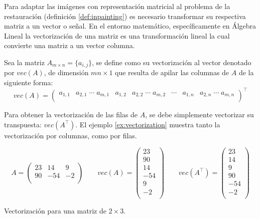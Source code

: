 Para adaptar las im\'agenes con representaci\'on matricial al problema de la restauraci\'on (definición \ref{def:inpainting}) es necesario transformar su respectiva matriz a un vector o señal. En el entorno matem\'atico, específicamente en \'Algebra Lineal \cite{enwiki:la} la vectorizaci\'on de una matriz es una transformaci\'on lineal la cual convierte una matriz a un vector columna.
\begin{definition}
	Sea la matriz $A_{m \times n} = \{a_{i,j}\}$, se define como su vectorizaci\'on al vector denotado por $vec(A)$, de dimensi\'on $mn \times 1$ que resulta de apilar las columnas de $A$ de la siguiente forma:
	\begin{equation*}
		vec(A) = \left(
		\begin{array}{ccccccc}
		a_{1,1}&a_{2,1}\;\cdots\;a_{m,1}&a_{1,2}&a_{2,2}\;\cdots\;a_{m,2}&\cdots&a_{1,n}&a_{2,n}\;\cdots\;a_{m,n}\\
		\end{array} \right)^\intercal
	\end{equation*}
\end{definition}
Para obtener la vectorizaci\'on de las filas de $A$, se debe simplemente vectorizar su transpuesta: $vec(A^\intercal)$. El ejemplo \ref{ex:vectorization} muestra tanto la vectorizaci\'on por columnas, como por filas.

\begin{example}[h]
	\[
		A = \left(
		\begin{matrix}
			23 & 14 & 9\\
			90 & -54 & -2\\
		\end{matrix}\right)
		\qquad
		vec(A) = \left(
		\begin{matrix}
			23\\
			90\\
			14\\
			-54\\
			9\\
			-2\\
		\end{matrix}\right)
		\qquad
		vec(A^\intercal) = \left(
		\begin{matrix}
			23\\
			14\\
			9\\
			90\\
			-54\\
			-2\\
		\end{matrix}\right)
	\]
	\caption{Vectorizaci\'on para una matriz de $2 \times 3$.}
	\label{ex:vectorization}
\end{example}


